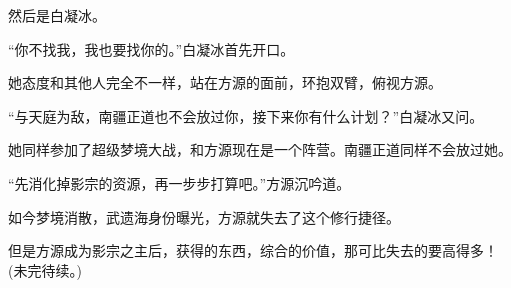 \begin{this_body}
然后是白凝冰。

“你不找我，我也要找你的。”白凝冰首先开口。

她态度和其他人完全不一样，站在方源的面前，环抱双臂，俯视方源。

“与天庭为敌，南疆正道也不会放过你，接下来你有什么计划？”白凝冰又问。

她同样参加了超级梦境大战，和方源现在是一个阵营。南疆正道同样不会放过她。

“先消化掉影宗的资源，再一步步打算吧。”方源沉吟道。

如今梦境消散，武遗海身份曝光，方源就失去了这个修行捷径。

但是方源成为影宗之主后，获得的东西，综合的价值，那可比失去的要高得多！(未完待续。)

\end{this_body}

